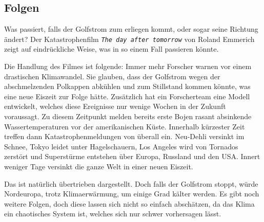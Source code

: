 \subsection{Folgen}

Was passiert, falls der Golfstrom zum erliegen kommt, oder sogar seine Richtung ändert?
Der Katastrophenfilm \texttt{\em The day after tomorrow} von Roland Emmerich zeigt auf eindrückliche Weise, was in so einem Fall passieren könnte. 

Die Handlung des Filmes ist folgende: Immer mehr Forscher warnen vor einem drastischen Klimawandel. Sie glauben, dass der Golfstrom wegen der abschmelzenden Polkappen abkühlen und zum Stillstand kommen könnte, was eine neue Eiszeit zur Folge hätte. Zusätzlich hat ein Forscherteam eine Modell entwickelt, welches diese Ereignisse nur wenige Wochen in der Zukunft voraussagt. Zu diesem Zeitpunkt melden bereits erste Bojen rasant absinkende Wassertemperaturen vor der amerikanischen Küste. Innerhalb kürzester Zeit treffen dann Katastrophenmeldungen von überall ein. Neu-Dehli versinkt im Schnee, Tokyo leidet unter Hagelschauern, Los Angeles wird von Tornados zerstört und Superstürme entstehen über Europa, Russland und den USA. 
Innert weniger Tage versinkt die ganze Welt in einer neuen Eiszeit. 

Das ist natürlich übertrieben dargestellt. Doch falls der Golfstrom stoppt, würde Nordeuropa, trotz Klimaerwärmung, um einige Grad kälter werden. Es gibt noch weitere Folgen, doch diese lassen sich nicht so einfach abschätzen, da das Klima ein chaotisches System ist, welches sich nur schwer vorhersagen lässt.

